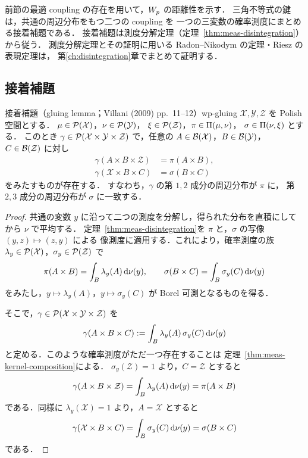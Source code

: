 前節の最適 coupling の存在を用いて，$W_p$ の距離性を示す．
三角不等式の鍵は，共通の周辺分布をもつ二つの coupling を
一つの三変数の確率測度にまとめる接着補題である．
接着補題は測度分解定理（定理~\ref{thm:meas-disintegration}）から従う．
測度分解定理とその証明に用いる Radon--Nikodym の定理・Riesz の表現定理は，
第\ref{ch:disintegration}章でまとめて証明する．

\subsection{接着補題}

\begin{lemma}{接着補題（gluing lemma；Villani (2009) pp.~11--12）}{wp-gluing}
  $\mathcal{X},\mathcal{Y},\mathcal{Z}$ を Polish 空間とする．
  $\mu\in\mathcal{P}(\mathcal{X})$，$\nu\in\mathcal{P}(\mathcal{Y})$，
  $\xi\in\mathcal{P}(\mathcal{Z})$，$\pi\in\Pi(\mu,\nu)$，
  $\sigma\in\Pi(\nu,\xi)$ とする．
  このとき $\gamma\in\mathcal{P}(\mathcal{X}\times\mathcal{Y}\times\mathcal{Z})$ で，任意の
  $A\in\mathcal{B}(\mathcal{X})$，$B\in\mathcal{B}(\mathcal{Y})$，
  $C\in\mathcal{B}(\mathcal{Z})$ に対し
  \[
    \begin{aligned}
      \gamma(A\times B\times\mathcal{Z})&=\pi(A\times B),\\
      \gamma(\mathcal{X}\times B\times C)&=\sigma(B\times C)
    \end{aligned}
  \]
  をみたすものが存在する．
  すなわち，$\gamma$ の第 $1,2$ 成分の周辺分布が $\pi$ に，
  第 $2,3$ 成分の周辺分布が $\sigma$ に一致する．

\end{lemma}

\begin{proof}
  共通の変数 $y$ に沿って二つの測度を分解し，得られた分布を直積にしてから $\nu$ で平均する．
  定理~\ref{thm:meas-disintegration}を $\pi$ と，$\sigma$ の写像 $(y,z)\mapsto(z,y)$ による
  像測度に適用する．これにより，確率測度の族
  $\lambda_y\in\mathcal{P}(\mathcal{X})$，$\sigma_y\in\mathcal{P}(\mathcal{Z})$ で
  \[
    \pi(A\times B)=\int_B\lambda_y(A)\,\mathrm{d}\nu(y),\qquad
    \sigma(B\times C)=\int_B\sigma_y(C)\,\mathrm{d}\nu(y)
  \]
  をみたし，$y\mapsto\lambda_y(A)$，$y\mapsto\sigma_y(C)$ が Borel 可測となるものを得る．

  そこで，$\gamma\in\mathcal{P}(\mathcal{X}\times\mathcal{Y}\times\mathcal{Z})$ を
  \[
    \gamma(A\times B\times C):=\int_B\lambda_y(A)\,\sigma_y(C)\,\mathrm{d}\nu(y)
  \]
  と定める．このような確率測度がただ一つ存在することは
  定理~\ref{thm:meas-kernel-composition}による．
  $\sigma_y(\mathcal{Z})=1$ より，$C=\mathcal{Z}$ とすると
  \[
    \gamma(A\times B\times\mathcal{Z})=\int_B\lambda_y(A)\,\mathrm{d}\nu(y)=\pi(A\times B)
  \]
  である．同様に $\lambda_y(\mathcal{X})=1$ より，$A=\mathcal{X}$ とすると
  \[
    \gamma(\mathcal{X}\times B\times C)=\int_B\sigma_y(C)\,\mathrm{d}\nu(y)=\sigma(B\times C)
  \]
  である．
\end{proof}

